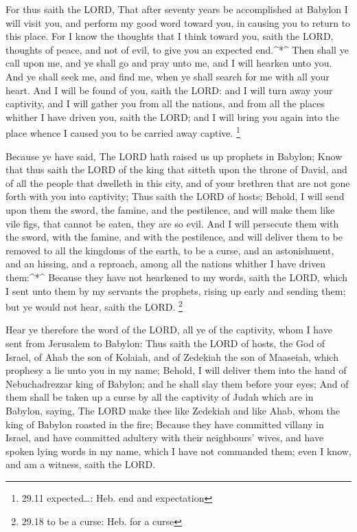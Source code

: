  For thus saith the LORD, That after seventy years be
accomplished at Babylon I will visit you, and perform my good word
toward you, in causing you to return to this place.  For I
know the thoughts that I think toward you, saith the LORD, thoughts of
peace, and not of evil, to give you an expected end.\^{}*\^{}
 Then shall ye call upon me, and ye shall go and pray unto
me, and I will hearken unto you.  And ye shall seek me, and
find me, when ye shall search for me with all your heart. 
And I will be found of you, saith the LORD: and I will turn away your
captivity, and I will gather you from all the nations, and from all the
places whither I have driven you, saith the LORD; and I will bring you
again into the place whence I caused you to be carried away captive.
\footnote{29.11 expected\ldots: Heb. end and expectation}

 Because ye have said, The LORD hath raised us up prophets
in Babylon;  Know that thus saith the LORD of the king that
sitteth upon the throne of David, and of all the people that dwelleth in
this city, and of your brethren that are not gone forth with you into
captivity;  Thus saith the LORD of hosts; Behold, I will
send upon them the sword, the famine, and the pestilence, and will make
them like vile figs, that cannot be eaten, they are so evil.
 And I will persecute them with the sword, with the famine,
and with the pestilence, and will deliver them to be removed to all the
kingdoms of the earth, to be a curse, and an astonishment, and an
hissing, and a reproach, among all the nations whither I have driven
them:\^{}*\^{}  Because they have not hearkened to my
words, saith the LORD, which I sent unto them by my servants the
prophets, rising up early and sending them; but ye would not hear, saith
the LORD. \footnote{29.18 to be a curse: Heb. for a curse}

 Hear ye therefore the word of the LORD, all ye of the
captivity, whom I have sent from Jerusalem to Babylon: 
Thus saith the LORD of hosts, the God of Israel, of Ahab the son of
Kolaiah, and of Zedekiah the son of Maaseiah, which prophesy a lie unto
you in my name; Behold, I will deliver them into the hand of
Nebuchadrezzar king of Babylon; and he shall slay them before your eyes;
 And of them shall be taken up a curse by all the captivity
of Judah which are in Babylon, saying, The LORD make thee like Zedekiah
and like Ahab, whom the king of Babylon roasted in the fire;
 Because they have committed villany in Israel, and have
committed adultery with their neighbours' wives, and have spoken lying
words in my name, which I have not commanded them; even I know, and am a
witness, saith the LORD.

